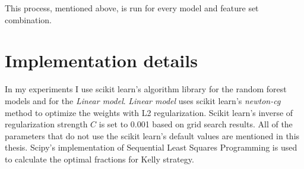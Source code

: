 This process, mentioned above, is run for every model and feature set combination.

\section{Implementation details}
In my experiments I use scikit learn's algorithm library \cite{scipy} for the random forest models and for the \textit{Linear model}. \textit{Linear model} uses scikit learn's \textit{newton-cg} method to optimize the weights with L2 regularization. Scikit learn's inverse of regularization strength $C$ is set to 0.001 based on grid search results. All of the parameters that do not use the scikit learn's default values are mentioned in this thesis. Scipy's implementation of Sequential Least Squares Programming is used to calculate the optimal fractions for Kelly strategy.